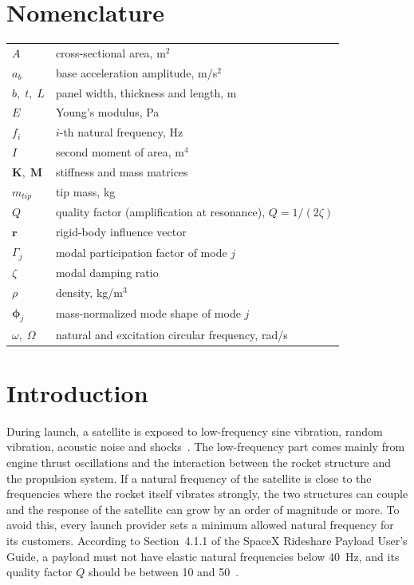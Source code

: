 \documentclass[letterpaper,10pt]{article}
\begin{document}
\section*{Nomenclature}
\vspace{-4pt}
{\small
\begin{tabular}{@{}p{2.2cm}@{\;=\;}p{12.5cm}@{}}
$A$ & cross-sectional area, m$^2$ \\
$a_b$ & base acceleration amplitude, m/s$^2$ \\
$b,\;t,\;L$ & panel width, thickness and length, m \\
$E$ & Young's modulus, Pa \\
$f_i$ & $i$-th natural frequency, Hz \\
$I$ & second moment of area, m$^4$ \\
$\mathbf{K},\;\mathbf{M}$ & stiffness and mass matrices \\
$m_{tip}$ & tip mass, kg \\
$Q$ & quality factor (amplification at resonance), $Q = 1/(2\zeta)$ \\
$\mathbf{r}$ & rigid-body influence vector \\
$\Gamma_j$ & modal participation factor of mode $j$ \\
$\zeta$ & modal damping ratio \\
$\rho$ & density, kg/m$^3$ \\
$\boldsymbol{\phi}_j$ & mass-normalized mode shape of mode $j$ \\
$\omega,\;\Omega$ & natural and excitation circular frequency, rad/s \\
\end{tabular}
}

\section{Introduction}

During launch, a satellite is exposed to low-frequency sine vibration, random
vibration, acoustic noise and shocks~\cite{wijker}. The low-frequency part comes mainly from
engine thrust oscillations and the interaction between the rocket structure and the
propulsion system. If a natural frequency of the satellite is close to the
frequencies where the rocket itself vibrates strongly, the two structures can couple
and the response of the satellite can grow by an order of magnitude or more. To
avoid this, every launch provider sets a minimum allowed natural frequency for its
customers. According to Section~4.1.1 of the SpaceX Rideshare Payload User's Guide,
a payload must not have elastic natural frequencies below 40~Hz, and its quality
factor $Q$ should be between 10 and 50~\cite{rideshare}.
\end{document}
